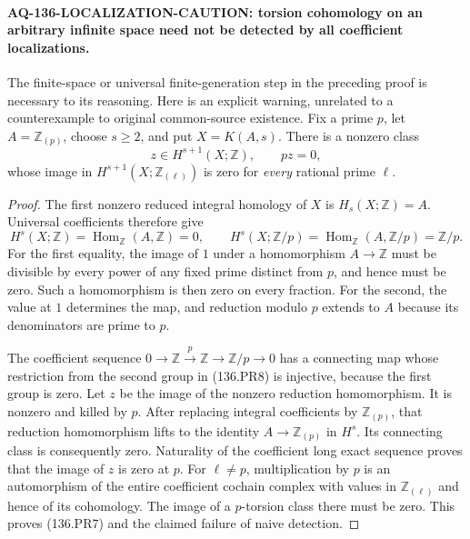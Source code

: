 \paragraph{AQ-136-LOCALIZATION-CAUTION: torsion cohomology on an arbitrary infinite space need not be detected by all coefficient localizations.}
The finite-space or universal finite-generation step
in the preceding proof is necessary to its reasoning.
Here is an explicit warning, unrelated to a counterexample
to original common-source existence.
Fix a prime $p$, let $A=\mathbb Z_{(p)}$, choose $s\ge2$,
and put $X=K(A,s)$. There is a nonzero class
\[
             z\in H^{s+1}(X;\mathbb Z),\qquad pz=0,
                                                               \tag{136.PR7}
\]
whose image in $H^{s+1}(X;\mathbb Z_{(\ell)})$ is
zero for \emph{every} rational prime $\ell$.

\begin{proof}
The first nonzero reduced integral homology of $X$
is $H_s(X;\mathbb Z)=A$. Universal coefficients
therefore give
\[
 H^s(X;\mathbb Z)=\operatorname{Hom}_{\mathbb Z}(A,\mathbb Z)=0,
 \qquad H^s(X;\mathbb Z/p)=\operatorname{Hom}_{\mathbb Z}
                                      (A,\mathbb Z/p)=\mathbb Z/p.
                                                               \tag{136.PR8}
\]
For the first equality, the image of $1$ under a
homomorphism $A\to\mathbb Z$ must be divisible by
every power of any fixed prime distinct from $p$,
and hence must be zero. Such a homomorphism is
then zero on every fraction. For the second, the
value at $1$ determines the map, and reduction
modulo $p$ extends to $A$ because its denominators
are prime to $p$.

The coefficient sequence
$0\to\mathbb Z\xrightarrow{p}\mathbb Z\to\mathbb Z/p\to0$
has a connecting map whose restriction from the
second group in (136.PR8) is injective, because
the first group is zero. Let $z$ be the image of
the nonzero reduction homomorphism. It is nonzero
and killed by $p$. After replacing integral
coefficients by $\mathbb Z_{(p)}$, that reduction
homomorphism lifts to the identity
$A\to\mathbb Z_{(p)}$ in $H^s$. Its connecting
class is consequently zero. Naturality of the
coefficient long exact sequence proves that the
image of $z$ is zero at $p$. For $\ell\ne p$,
multiplication by $p$ is an automorphism of the
entire coefficient cochain complex with values
in $\mathbb Z_{(\ell)}$ and hence of its cohomology.
The image of a $p$-torsion class there must be
zero. This proves (136.PR7) and the claimed
failure of naive detection.
\end{proof}

